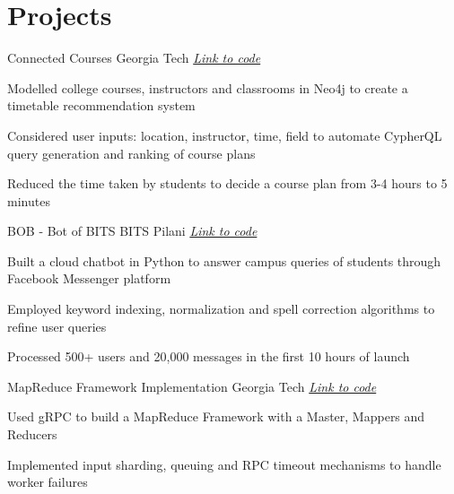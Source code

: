 \section{Projects}
\resumeSubHeadingListStart

\resumeProject
{Connected Courses}
{Georgia Tech} %
{} %
{\href{https://github.com/sankalp-sangle/connected-courses}{\emph{Link to code}}} 
\resumeItemListStart
    \item[$\bullet$]{Modelled college courses, instructors and classrooms in Neo4j to create a timetable recommendation system}
	\item[$\bullet$]{Considered user inputs: location, instructor, time, field to automate CypherQL query generation and ranking of course plans}
	\item[$\bullet$]{Reduced the time taken by students to decide a course plan from 3-4 hours to 5 minutes}
\resumeItemListEnd


\resumeProject
{BOB - Bot of BITS} %
{BITS Pilani} %
{} %
{\href{https://github.com/rahul-bothra/bob-the-bot}{\emph{Link to code}}} %
\resumeItemListStart
\item[$\bullet$]{Built a cloud chatbot in Python to answer campus queries of students through Facebook Messenger platform}
	\item[$\bullet$]{Employed keyword indexing, normalization and spell correction algorithms to refine user queries}
	\item[$\bullet$]{Processed 500+ users and 20,000 messages in the first 10 hours of launch}
\resumeItemListEnd

\resumeProject
{MapReduce Framework Implementation} %
{Georgia Tech} %
{} %
{\href{https://github.com/sankalp-sangle/AOSP4}{\emph{Link to code}}} %
\resumeItemListStart
\item[$\bullet$]{Used gRPC to build a MapReduce Framework with a Master, Mappers and Reducers}
	\item[$\bullet$]{Implemented input sharding, queuing and RPC timeout mechanisms to handle worker failures}
\resumeItemListEnd

\resumeSubHeadingListEnd

\vspace{-5.5mm}

